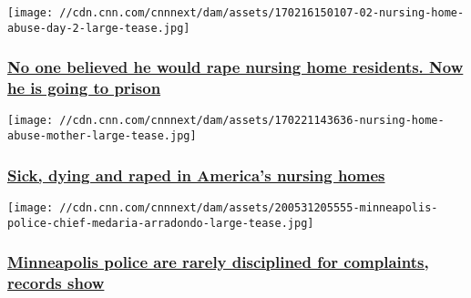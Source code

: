 \href{/2017/08/20/health/nursing-home-aide-rape-trial-guilty/index.html}{}

\texttt{[image: //cdn.cnn.com/cnnnext/dam/assets/170216150107-02-nursing-home-abuse-day-2-large-tease.jpg]}

\hypertarget{no-one-believed-he-would-rape-nursing-home-residents-now-he-is-going-to-prison}{%
\subsubsection{\texorpdfstring{\href{/2017/08/20/health/nursing-home-aide-rape-trial-guilty/index.html}{No
one believed he would rape nursing home residents. Now he is going to
prison}}{No one believed he would rape nursing home residents. Now he is going to prison}}\label{no-one-believed-he-would-rape-nursing-home-residents-now-he-is-going-to-prison}}

\href{http://www.cnn.com/interactive/2017/02/health/nursing-home-sex-abuse-investigation/}{}

\texttt{[image: //cdn.cnn.com/cnnnext/dam/assets/170221143636-nursing-home-abuse-mother-large-tease.jpg]}

\hypertarget{sick-dying-and-raped-in-americas-nursing-homes-1}{%
\subsubsection{\texorpdfstring{\href{http://www.cnn.com/interactive/2017/02/health/nursing-home-sex-abuse-investigation/}{Sick,
dying and raped in America's nursing
homes}}{Sick, dying and raped in America's nursing homes}}\label{sick-dying-and-raped-in-americas-nursing-homes-1}}

\href{/2020/06/11/us/minneapolis-police-discipline-invs/index.html}{}

\texttt{[image: //cdn.cnn.com/cnnnext/dam/assets/200531205555-minneapolis-police-chief-medaria-arradondo-large-tease.jpg]}

\hypertarget{minneapolis-police-are-rarely-disciplined-for-complaints-records-show-1}{%
\subsubsection{\texorpdfstring{\href{/2020/06/11/us/minneapolis-police-discipline-invs/index.html}{Minneapolis
police are rarely disciplined for complaints, records
show}}{Minneapolis police are rarely disciplined for complaints, records show}}\label{minneapolis-police-are-rarely-disciplined-for-complaints-records-show-1}}

